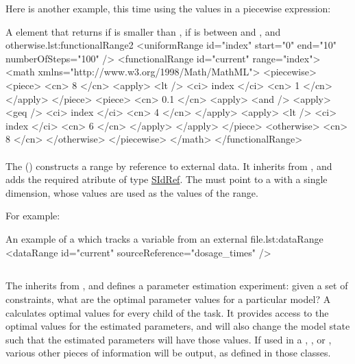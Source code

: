 Here is another example, this time using the values in a piecewise expression: 

\begin{myXmlLst}{A  element that returns  if  is smaller than ,  if  is between  and , and  otherwise.}{lst:functionalRange2}
<uniformRange id="index" start="0" end="10" numberOfSteps="100" />
<functionalRange id="current" range="index">
	<math xmlns="http://www.w3.org/1998/Math/MathML">
		<piecewise>
			<piece>
				<cn> 8 </cn>
				<apply>
					<lt />
					<ci> index </ci>
					<cn> 1 </cn>
				</apply>
			</piece>
			<piece>
				<cn> 0.1 </cn>
				<apply>
					<and />
					<apply>
						<geq />
                    	<ci> index </ci>
                    	<cn> 4 </cn>
					</apply>
					<apply>
						<lt />
						<ci> index </ci>
						<cn> 6 </cn>
					</apply>
				</apply>
			</piece>
			<otherwise>
				<cn> 8 </cn>
			</otherwise>
		</piecewise>
	</math>
</functionalRange>
\end{myXmlLst}

\paragraph{}
\label{class:dataRange}
The  () constructs a range by reference to external data. It inherits from \Range, and adds the required atribute  of type \hyperref[type:sidref]{SIdRef}.  The  must point to a \DataDescription with a single dimension, whose values are used as the values of the range.

For example:

\begin{myXmlLst}{An example of a  which tracks a variable from an external file.}{lst:dataRange}
    <dataRange id="current" sourceReference="dosage_times" />
\end{myXmlLst}


\subsection{}
\label{class:parameterEstimationTask}
\label{class:listOfAdjustableParameters}
\label{class:listOfFitExperiments}

The \ParameterEstimationTask inherits from \AbstractTask, and defines a parameter estimation experiment:  given a set of constraints, what are the optimal parameter values for a particular model? A \ParameterEstimationTask calculates optimal \AdjustableParameter values for every \FitExperiment child of the task.   It  provides access to the optimal values for the estimated parameters, and will also change the model state such that the estimated parameters will have those values.  If used in a \ParameterEstimationResultPlot, \WaterfallPlot, or \ParameterEstimationReport, various other pieces of information will be output, as defined in those classes.

